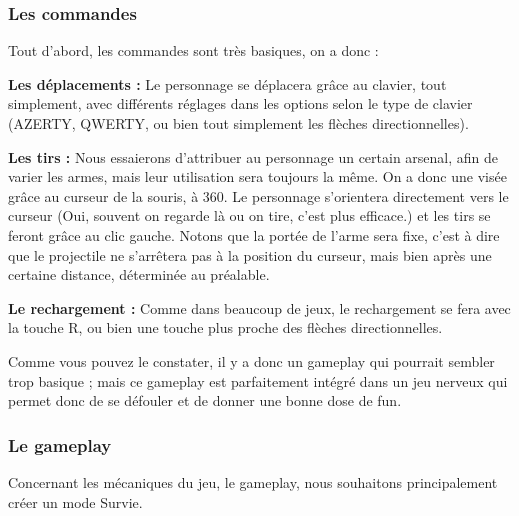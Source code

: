 \documentclass{article}
\begin{document}
\subsubsection{Les commandes}

\par
Tout d'abord, les commandes sont très basiques, on a donc :
\newline

\par
\textbf{Les déplacements :} Le personnage se déplacera grâce au clavier, tout simplement, avec différents réglages dans les options selon le type de clavier (AZERTY, QWERTY, ou bien tout simplement les flèches directionnelles).
\newline

\par
\textbf{Les tirs :} Nous essaierons d'attribuer au personnage un certain arsenal, afin de varier les armes, mais leur utilisation sera toujours la même. On a donc une visée grâce au curseur de la souris, à 360\textdegree . Le personnage s'orientera directement vers le curseur (Oui, souvent on regarde là ou on tire, c'est plus efficace.) et les tirs se feront grâce au clic gauche. Notons que la portée de l'arme sera fixe, c'est à dire que le projectile ne s'arrêtera pas à la position du curseur, mais bien après une certaine distance, déterminée au préalable.
\newline

\par
\textbf{Le rechargement :} Comme dans beaucoup de jeux, le rechargement se fera avec la touche R, ou bien une touche plus proche des flèches directionnelles.
\newline

\par
Comme vous pouvez le constater, il y a donc un gameplay qui pourrait sembler trop basique ; mais ce gameplay est parfaitement intégré dans un jeu nerveux qui permet donc de se défouler et de donner une bonne dose de fun.
\newline

\subsubsection{Le gameplay}

\par
Concernant les mécaniques du jeu, le gameplay, nous souhaitons principalement créer un mode Survie.
\newline
\end{document}
